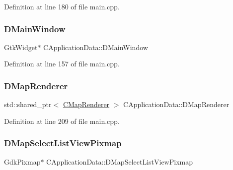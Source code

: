 Definition at line 180 of file main.\+cpp.

\hypertarget{classCApplicationData_af3c57a84b4ecca8a7f86b67a0ae55372}{}\label{classCApplicationData_af3c57a84b4ecca8a7f86b67a0ae55372} 
\subsubsection{\texorpdfstring{D\+Main\+Window}{DMainWindow}}
{\footnotesize\ttfamily Gtk\+Widget$\ast$ C\+Application\+Data\+::\+D\+Main\+Window\hspace{0.3cm}{\ttfamily [protected]}}



Definition at line 157 of file main.\+cpp.

\hypertarget{classCApplicationData_afaf62b458bd7a0ec93ab9f063d7ea8d7}{}\label{classCApplicationData_afaf62b458bd7a0ec93ab9f063d7ea8d7} 
\subsubsection{\texorpdfstring{D\+Map\+Renderer}{DMapRenderer}}
{\footnotesize\ttfamily std\+::shared\+\_\+ptr$<$ \hyperlink{classCMapRenderer}{C\+Map\+Renderer} $>$ C\+Application\+Data\+::\+D\+Map\+Renderer\hspace{0.3cm}{\ttfamily [protected]}}



Definition at line 209 of file main.\+cpp.

\hypertarget{classCApplicationData_a76e4af228d69ca3c6b1cf0770ca2e7a0}{}\label{classCApplicationData_a76e4af228d69ca3c6b1cf0770ca2e7a0} 
\subsubsection{\texorpdfstring{D\+Map\+Select\+List\+View\+Pixmap}{DMapSelectListViewPixmap}}
{\footnotesize\ttfamily Gdk\+Pixmap$\ast$ C\+Application\+Data\+::\+D\+Map\+Select\+List\+View\+Pixmap\hspace{0.3cm}{\ttfamily [protected]}}



